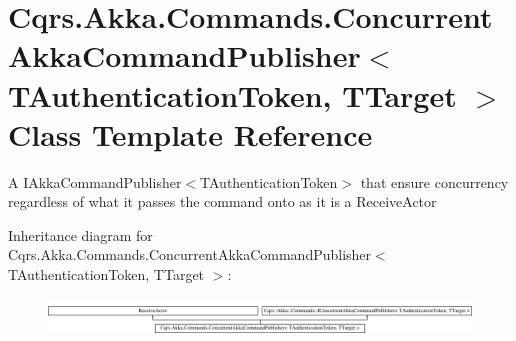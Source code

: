 \hypertarget{classCqrs_1_1Akka_1_1Commands_1_1ConcurrentAkkaCommandPublisher}{}\section{Cqrs.\+Akka.\+Commands.\+Concurrent\+Akka\+Command\+Publisher$<$ T\+Authentication\+Token, T\+Target $>$ Class Template Reference}
\label{classCqrs_1_1Akka_1_1Commands_1_1ConcurrentAkkaCommandPublisher}


A I\+Akka\+Command\+Publisher$<$\+T\+Authentication\+Token$>$ that ensure concurrency regardless of what it passes the command onto as it is a Receive\+Actor  


Inheritance diagram for Cqrs.\+Akka.\+Commands.\+Concurrent\+Akka\+Command\+Publisher$<$ T\+Authentication\+Token, T\+Target $>$\+:\begin{figure}[H]
\begin{center}
\leavevmode
\includegraphics[height=1.012658cm]{classCqrs_1_1Akka_1_1Commands_1_1ConcurrentAkkaCommandPublisher}
\end{center}
\end{figure}
